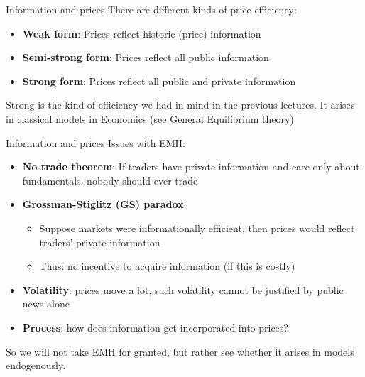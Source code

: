 \documentclass[english,10pt]{beamer}
\begin{document}
\begin{frame}{Information and prices}
	There are different kinds of price efficiency:
	\begin{itemize}
		\item \textbf{Weak form}: Prices reflect historic (price) information
		\item \textbf{Semi-strong form}: Prices reflect all public information
		\item \textbf{Strong form}: Prices reflect all public and private information
	\end{itemize}
	Strong is the kind of efficiency we had in mind in the previous lectures. It arises in classical models in Economics (see General Equilibrium theory)
\end{frame}


\begin{frame}{Information and prices}
Issues with EMH:
\begin{itemize}
	\item \textbf{No-trade theorem}: If traders have private information and care only about fundamentals, nobody should ever trade
	\item \textbf{Grossman-Stiglitz (GS) paradox}: 
	\begin{itemize}
		\item Suppose markets were informationally efficient, then prices would reflect traders' private information
		\item Thus: no incentive to acquire information (if this is costly)
	\end{itemize} 
	\item \textbf{Volatility}: prices move a lot, such volatility cannot be justified by public news alone
	\item \textbf{Process}: \alert{how} does information get incorporated into prices?
\end{itemize}
So we will not take EMH for granted, but rather see whether it arises in models endogenously.
\end{frame}
\end{document}
